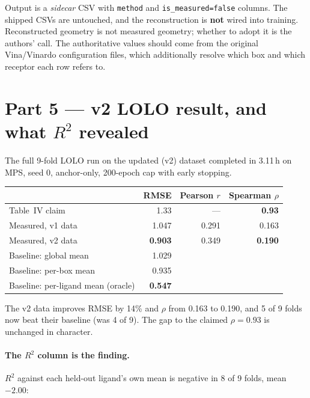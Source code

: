 \documentclass[11pt,a4paper]{article}
\newcommand{\bad}[1]{\textcolor{badred}{#1}}
\newcommand{\code}[1]{\texttt{\small #1}}
\begin{document}
Output is a \emph{sidecar} CSV with \code{method} and \code{is\_measured=false}
columns. The shipped CSVs are untouched, and the reconstruction is
\textbf{not} wired into training. Reconstructed geometry is not measured
geometry; whether to adopt it is the authors' call. The authoritative values
should come from the original Vina/Vinardo configuration files, which
additionally resolve which box and which receptor each row refers to.

\section{Part 5 --- v2 LOLO result, and what $R^2$ revealed}

The full 9-fold LOLO run on the updated (v2) dataset completed in 3.11\,h on
MPS, seed 0, anchor-only, 200-epoch cap with early stopping.

\begin{center}
\begin{tabular}{@{}lrrr@{}}
\toprule
 & \textbf{RMSE} & \textbf{Pearson $r$} & \textbf{Spearman $\rho$} \\
\midrule
Table~IV claim        & 1.33  & ---   & \textbf{0.93} \\
Measured, v1 data     & 1.047 & 0.291 & \bad{0.163} \\
Measured, v2 data     & \textbf{0.903} & 0.349 & \bad{\textbf{0.190}} \\
\midrule
Baseline: global mean & 1.029 & & \\
Baseline: per-box mean& 0.935 & & \\
Baseline: per-ligand mean (oracle) & \textbf{0.547} & & \\
\bottomrule
\end{tabular}
\end{center}

The v2 data improves RMSE by 14\% and $\rho$ from 0.163 to 0.190, and 5 of 9
folds now beat their baseline (was 4 of 9). \bad{The gap to the claimed
$\rho = 0.93$ is unchanged in character.}

\paragraph{The $R^2$ column is the finding.} $R^2$ against each held-out
ligand's own mean is \bad{negative in 8 of 9 folds}, mean $-2.00$:
\end{document}
